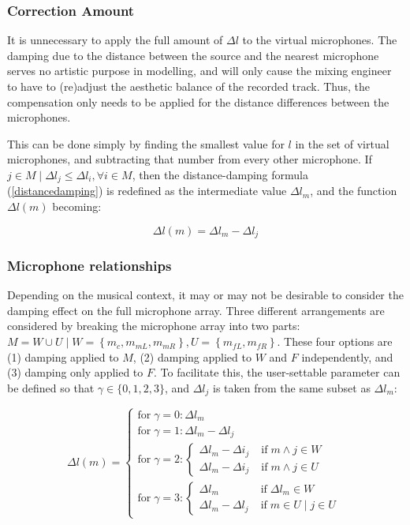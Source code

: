 \subsubsection{Correction Amount}

It is unnecessary to apply the full amount of $\Delta{l}$ to the virtual microphones. The damping due to the distance between the source and the nearest microphone serves no artistic purpose in modelling, and will only cause the mixing engineer to have to (re)adjust the aesthetic balance of the recorded track. Thus, the compensation only needs to be applied for the distance differences between the microphones.

This can be done simply by finding the smallest value for $l$ in the set of virtual microphones, and subtracting that number from every other microphone. If $j \in M \;|\; \Delta{l}_j \leq \Delta{l}_i, \forall i \in M$, then the distance-damping formula (\ref{distancedamping}) is redefined as the intermediate value $\Delta{l}_m$, and the function $\Delta{l}(m)$ becoming:

\begin{equation}
\Delta{l}(m) = \Delta{l}_m - \Delta{l}_j
\end{equation}

\subsubsection{Microphone relationships}

Depending on the musical context, it may or may not be desirable to consider the damping effect on the full microphone array. Three different arrangements are considered by breaking the microphone array into two parts: $M = W \cup U \;|\; W = \left\{m_c, m_{mL}, m_{mR}\right\}, U = \left\{m_{fL}, m_{fR}\right\}$. These four options are (1) damping applied to $M$, (2) damping applied to $W$ and $F$ independently, and (3) damping only applied to $F$. To facilitate this, the user-settable parameter can be defined so that $\gamma \in \{0, 1, 2, 3\}$, and $\Delta{l}_j$ is taken from the same subset as $\Delta{l}_m$:

\begin{equation}
\Delta{l}(m) = \begin{cases}
\text{for}\; \gamma = 0:\Delta{l}_m \\
\text{for}\; \gamma = 1:\Delta{l}_m - \Delta{l}_j\\
\text{for}\; \gamma = 2:\begin{cases}
\Delta{l}_m - \Delta{i}_j \; &\text{if}\; m\land{}j\in{}W\\
\Delta{l}_m - \Delta{i}_j \; &\text{if}\; m\land{}j\in{}U
\end{cases}\\
\text{for}\; \gamma = 3:\begin{cases}
\Delta{l}_m \; &\text{if}\;\Delta{l}_m\in{}W\\
\Delta{l}_m - \Delta{l}_j \; &\text{if}\;m\in{}U \;|\; j\in{}U
\end{cases}
\end{cases}
\end{equation}
